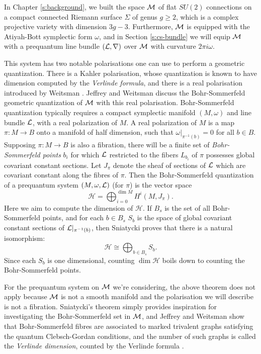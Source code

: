 
	In Chapter \ref{s:background}, we built the space $\mathcal{M}$ of flat $SU(2)$ connections on a compact connected Riemann surface $\Sigma$ of genus $g\geq 2$, which is a complex projective variety with dimension $3g-3$. Furthermore, $\mathcal{M}$ is equipped with the Atiyah-Bott symplectic form $\omega$, and in Section \ref{s:cs-bundle} we will equip $\mathcal{M}$ with a prequantum line bundle $(\mathcal{L},\nabla)$ over $\mathcal{M}$ with curvature $2\pi i \omega$.
	
	This system has two notable polarisations one can use to perform a geometric quantization. There is a Kahler polarisation, whose quantization is known to have dimension computed by the \emph{Verlinde formula}, and there is a real polarisation introduced by Weitsman \cite{weitsman_real_1992}. Jeffrey and Weitsman discuss the Bohr-Sommerfeld geometric quantization of $\mathcal{M}$ with this real polarisation. Bohr-Sommerfeld quantization typically requires a compact symplectic manifold $(M,\omega)$ and line bundle $\mathcal{L}$, with a real polarization of $M$. A real polarization of $M$ is a map $\pi:M\to B$ onto a manifold of half dimension, such that $\omega|_{\pi^{-1}(b)} =0$ for all $b\in B$. Supposing $\pi:M\to B$ is also a fibration, there will be a finite set of \textit{Bohr-Sommerfeld points} $b_i$ for which $\mathcal{L}$ restricted to the fibers $L_{b_i}$ of $\pi$ possesses global covariant constant sections. Let $J_\pi$ denote the sheaf of sections of $\mathcal{L}$ which are covariant constant along the fibres of $\pi$. Then the Bohr-Sommerfeld quantization of a prequantum system $(M,\omega,\mathcal{L})$ (for $\pi$) is the vector space
	\begin{equation}
		\mathcal{H} = \bigoplus_{i=0}^{\dim M} H^i(M,J_\pi).
	\end{equation}
	Here we aim to compute the dimension of $\mathcal{H}$. If $B_s$ is the set of all Bohr-Sommerfeld points, and for each $b\in B_s$ $S_b$ is the space of global covariant constant sections of $\mathcal{L}|_{\pi^{-1}(b)}$, then Sniatycki \cite{sniatycki_cohomology_1977} proves that there is a natural isomorphism:
	\begin{equation}
		\mathcal{H} \cong \bigoplus_{b\in B_s} S_b.
	\end{equation}
	Since each $S_b$ is one dimensional, counting $\dim \mathcal{H}$ boils down to counting the Bohr-Sommerfeld points. 
	
	For the prequantum system on $\mathcal{M}$ we're considering, the above theorem does not apply because $\mathcal{M}$ is not a smooth manifold and the polarisation we will describe is not a fibration. Sniatycki's theorem simply provides inspiration for investigating the Bohr-Sommerfeld set in $\mathcal{M}$, and Jeffrey and Weitsman show that Bohr-Sommerfeld fibres are associated to marked trivalent graphs satisfying the quantum Clebsch-Gordan conditions, and the number of such graphs is called the \emph{Verlinde dimension}, counted by the Verlinde formula \cite[Thm. 8.1]{jeffrey_bohr-sommerfeld_1992}.
	
